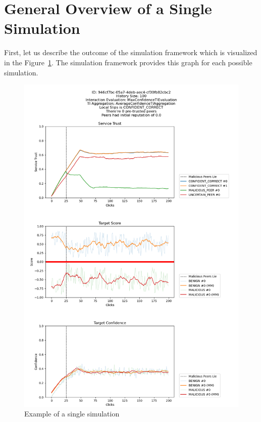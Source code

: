 \section{General Overview of a Single Simulation}
\label{sec:general-overview-of-simulation-output}
First, let us describe the outcome of the simulation framework which is visualized in the Figure~\ref{fig:single-simulation-example}.
The simulation framework provides this graph for each possible simulation.

\begin{figure}
    \centering
    \includegraphics[width=1.0\textwidth]{assets/example_evaluation.png}
    \caption{Example of a single simulation}
    \label{fig:single-simulation-example}
\end{figure}

